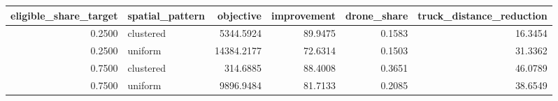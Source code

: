 \begin{tabular}{rlrrrr}
\toprule
eligible_share_target & spatial_pattern & objective & improvement & drone_share & truck_distance_reduction \\
\midrule
0.2500 & clustered & 5344.5924 & 89.9475 & 0.1583 & 16.3454 \\
0.2500 & uniform & 14384.2177 & 72.6314 & 0.1503 & 31.3362 \\
0.7500 & clustered & 314.6885 & 88.4008 & 0.3651 & 46.0789 \\
0.7500 & uniform & 9896.9484 & 81.7133 & 0.2085 & 38.6549 \\
\bottomrule
\end{tabular}
